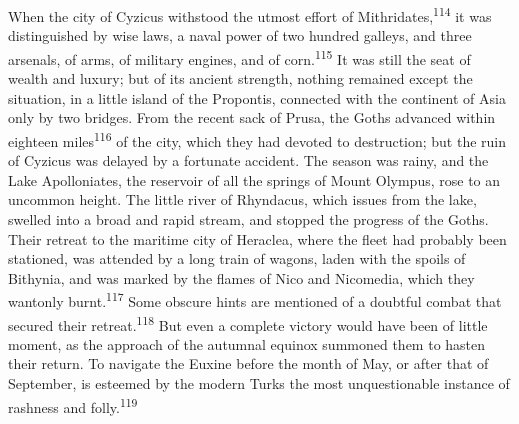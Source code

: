 


When the city of Cyzicus withstood the utmost effort of
Mithridates,\textsuperscript{114} it was distinguished by wise laws, a naval power
of two hundred galleys, and three arsenals, of arms, of military
engines, and of corn.\textsuperscript{115} It was still the seat of wealth and
luxury; but of its ancient strength, nothing remained except the
situation, in a little island of the Propontis, connected with
the continent of Asia only by two bridges. From the recent sack
of Prusa, the Goths advanced within eighteen miles\textsuperscript{116} of the
city, which they had devoted to destruction; but the ruin of
Cyzicus was delayed by a fortunate accident. The season was
rainy, and the Lake Apolloniates, the reservoir of all the
springs of Mount Olympus, rose to an uncommon height. The little
river of Rhyndacus, which issues from the lake, swelled into a
broad and rapid stream, and stopped the progress of the Goths.
Their retreat to the maritime city of Heraclea, where the fleet
had probably been stationed, was attended by a long train of
wagons, laden with the spoils of Bithynia, and was marked by the
flames of Nico and Nicomedia, which they wantonly burnt.\textsuperscript{117} Some
obscure hints are mentioned of a doubtful combat that secured
their retreat.\textsuperscript{118} But even a complete victory would have been of
little moment, as the approach of the autumnal equinox summoned
them to hasten their return. To navigate the Euxine before the
month of May, or after that of September, is esteemed by the
modern Turks the most unquestionable instance of rashness and
folly.\textsuperscript{119}






